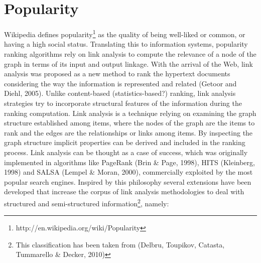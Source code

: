 \section{Popularity}
Wikipedia defines popularity\footnote{http://en.wikipedia.org/wiki/Popularity} as the quality of being well-liked or common, or having a 
high social status. Translating this to information systems, popularity ranking algorithms rely on link analysis to compute the relevance of a 
node of the graph in terms of its input and output linkage.
With the arrival of the Web, link analysis was proposed as a new method to rank the hypertext documents considering the way the information 
is represented and related \cite{}(Getoor and Diehl, 2005). Unlike content-based (statistics-based?) ranking, link analysis strategies try to incorporate 
structural features of the information during the ranking computation. Link analysis is a technique relying on examining the graph structure 
established among items, where the nodes of the graph are the items to rank and the edges are the relationships or links among items. By inspecting 
the graph structure implicit properties can be derived and included in the ranking process. Link analysis can be thought as a case of success, 
which was originally implemented in algorithms like PageRank \cite{}(Brin \& Page, 1998), HITS \cite{}(Kleinberg, 1998) and SALSA \cite{}(Lempel \& Moran, 2000), 
commercially exploited by the most popular search engines. Inspired by this philosophy several extensions have been developed that increase 
the corpus of link analysis methodologies to deal with structured and semi-structured information\footnote{This classification has been taken from 
\cite{}(Delbru, Toupikov, Catasta, Tummarello \& Decker, 2010)}, namely:
